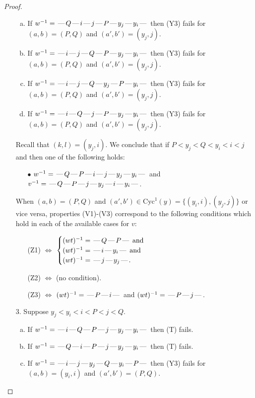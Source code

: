 \documentclass[10pt]{article}
\theoremstyle{definition}
\theoremstyle{definition}
\def\dash{\text{\hspace{0.5mm}---\hspace{0.5mm}}}
\def\Cyc{\mathrm{Cyc}}
\begin{document}
\begin{proof}
\begin{enumerate}
\begin{enumerate}[(a)]
\item If $w^{-1} = \dash Q\dash i\dash j\dash P\dash y_j\dash y_i\dash $ then (Y3) fails for $(a,b)=(P,Q)$ and $(a',b')=(y_j,j)$.
\item If $w^{-1} = \dash i\dash j\dash Q\dash P\dash y_j\dash y_i\dash $ then (Y3) fails for $(a,b)=(P,Q)$ and $(a',b')=(y_j,j)$.
\item If $w^{-1} = \dash i\dash j\dash Q\dash y_j\dash P\dash y_i\dash $ then (Y3) fails for $(a,b)=(P,Q)$ and $(a',b')=(y_j,j)$.
\item If $w^{-1} = \dash i\dash Q\dash j\dash P\dash y_j\dash y_i\dash $ then (Y3) fails for $(a,b)=(P,Q)$ and $(a',b')=(y_j,j)$.
\end{enumerate}
Recall that $(k,l) = (y_j,i)$.
We conclude that if $P < y_j < Q < y_i < i < j$ and then one of the following holds:
\begin{enumerate}
\item[$\bullet$] $w^{-1} = \dash Q\dash P\dash i\dash j\dash y_j\dash y_i\dash $ and $v^{-1} = \dash Q\dash P\dash j\dash y_j\dash i\dash y_i\dash $.
\end{enumerate}
When $(a,b)= (P,Q)$ and $(a',b')\in \Cyc^1(y)=\{(y_i,i),(y_j,j)\}$ or vice versa,
properties (V1)-(V3) correspond to the following conditions which hold in
each of the available cases for $v$:
\begin{enumerate}
\item[](Z1) $\Leftrightarrow$ $\begin{cases}\text{$(wt)^{-1} = \dash Q \dash P \dash$}\text{ and }\\
\text{$(wt)^{-1} = \dash i \dash y_i \dash$}\text{ and }\\
\text{$(wt)^{-1} = \dash j \dash y_j \dash$}.\end{cases}$
\item[](Z2) $\Leftrightarrow$ (no condition).
\item[](Z3) $\Leftrightarrow$ $(wt)^{-1} = \dash P \dash i \dash$  and $(wt)^{-1} = \dash P \dash j \dash$.
\end{enumerate}
\item[$3$.] Suppose $y_j < y_i < i < P < j < Q$.
\begin{enumerate}[(a)]
\item If $w^{-1} = \dash i\dash Q\dash P\dash j\dash y_j\dash y_i\dash $ then (T) fails.
\item If $w^{-1} = \dash Q\dash i\dash P\dash j\dash y_j\dash y_i\dash $ then (T) fails.
\item If $w^{-1} = \dash i\dash j\dash y_j\dash Q\dash y_i\dash P\dash $ then (Y3) fails for $(a,b)=(y_i,i)$ and $(a',b')=(P,Q)$.

\end{enumerate}
\end{enumerate}
\end{proof}
\end{document}
